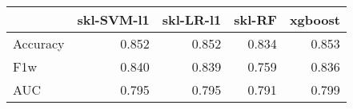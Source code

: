 \begin{tabular}{lrrrr}
\toprule
{} &  skl-SVM-l1 &  skl-LR-l1 &  skl-RF &  xgboost \\
\midrule
Accuracy &       0.852 &      0.852 &   0.834 &    0.853 \\
F1w      &       0.840 &      0.839 &   0.759 &    0.836 \\
AUC      &       0.795 &      0.795 &   0.791 &    0.799 \\
\bottomrule
\end{tabular}
